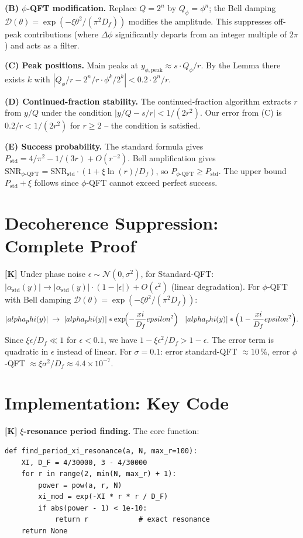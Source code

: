 \textbf{(B) $\phi$-QFT modification.} Replace $Q=2^n$ by $Q_\phi=\phi^n$; the
Bell damping $\mathcal D(\theta)=\exp(-\xi\theta^2/(\pi^2D_f))$ modifies the
amplitude. This suppresses off-peak contributions (where $\Delta\phi$ significantly
departs from an integer multiple of $2\pi$) and acts as a filter.

\textbf{(C) Peak positions.} Main peaks at
$y_{\phi,\text{peak}}\approx s\cdot Q_\phi/r$. By the Lemma there exists $k$ with
$|Q_\phi/r - 2^n/r\cdot\phi^k/2^k|<0{.}2\cdot2^n/r$.

\textbf{(D) Continued-fraction stability.} The continued-fraction algorithm
extracts $r$ from $y/Q$ under the condition $|y/Q-s/r|<1/(2r^2)$. Our error
from (C) is $0{.}2/r<1/(2r^2)$ for $r\ge2$ -- the condition is satisfied.

\textbf{(E) Success probability.} The standard formula gives
$P_\text{std}=4/\pi^2-1/(3r)+O(r^{-2})$. Bell amplification gives
$\text{SNR}_{\phi\text{-QFT}} = \text{SNR}_\text{std}\cdot(1+\xi\ln(r)/D_f)$,
so $P_{\phi\text{-QFT}}\ge P_\text{std}$. The upper bound $P_\text{std}+\xi$
follows since $\phi$-QFT cannot exceed perfect success.

\section{Decoherence Suppression: Complete Proof}

\textbf{[K]} Under phase noise $\epsilon\sim\mathcal N(0,\sigma^2)$, for
Standard-QFT: $|\alpha_\text{std}(y)|\to|\alpha_\text{std}(y)|\cdot(1-|\epsilon|)+O(\epsilon^2)$
(linear degradation). For $\phi$-QFT with Bell damping
$\mathcal D(\theta)=\exp(-\xi\theta^2/(\pi^2D_f))$:
\[
  |\alpha_\phi(y)|\;\to\;|\alpha_\phi(y)|\cdot
  \exp\!\Bigl(-\frac\xi{D_f}\epsilon^2\Bigr)
  \;\approx\;|\alpha_\phi(y)|\cdot\Bigl(1-\frac\xi{D_f}\epsilon^2\Bigr).
\]
Since $\xi\epsilon/D_f\ll1$ for $\epsilon<0{.}1$, we have $1-\xi\epsilon^2/D_f>1-\epsilon$.
The error term is quadratic in $\epsilon$ instead of linear. For $\sigma=0{.}1$:
error standard-QFT $\approx10\,\%$, error $\phi$-QFT
$\approx\xi\sigma^2/D_f\approx4{.}4\times10^{-7}$.

\section{Implementation: Key Code}

\textbf{[K]} \textbf{$\xi$-resonance period finding.} The core function:

\begin{verbatim}
def find_period_xi_resonance(a, N, max_r=100):
    XI, D_F = 4/30000, 3 - 4/30000
    for r in range(2, min(N, max_r) + 1):
        power = pow(a, r, N)
        xi_mod = exp(-XI * r * r / D_F)
        if abs(power - 1) < 1e-10:
            return r            # exact resonance
    return None
\end{verbatim}


